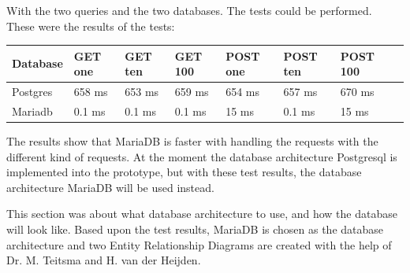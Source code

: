 \documentclass[paper=a4, fontsize=11pt,twoside]{scrartcl}	%
\begin{document}
With the two queries and the two databases. The tests could be performed. These were the results of the tests: \\

\begin{longtable}{ | l | p{1.5cm} | p{1.5cm} | p{1.5cm} | p{2cm} | p{2cm} | p{2cm} | p{2cm} | }
\hline
Database & GET one & GET ten & GET 100& POST one&POST ten&POST 100 \\ \hline
Postgres & 658 ms & 653 ms &  659 ms & 654 ms & 657 ms & 670 ms  \\ \hline
Mariadb & 0.1 ms & 0.1 ms & 0.1 ms & 15 ms & 0.1 ms & 15 ms \\ \hline
\end{longtable}

The results show that MariaDB is faster with handling the requests with the different kind of requests. At the moment the database architecture Postgresql is implemented into the prototype, but with these test results, the database architecture MariaDB will be used instead.

This section was about what database architecture to use, and how the database will look like. Based upon the test results, MariaDB is chosen as the database architecture and two Entity Relationship Diagrams are created with the help of Dr. M. Teitsma and H. van der Heijden.

\newpage
\end{document}
